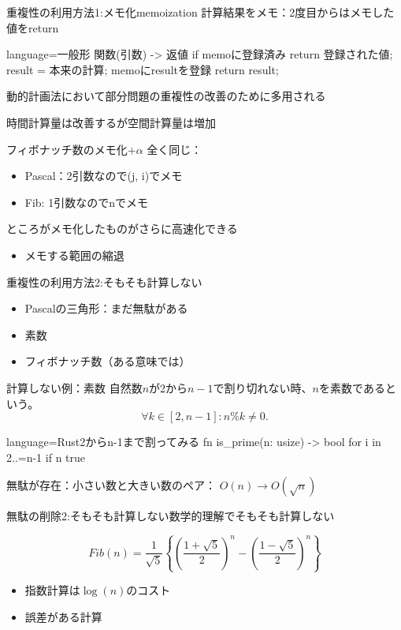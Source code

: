 \documentclass{beamer}
\begin{document}
\begin{frame}[fragile]{重複性の利用方法1:メモ化}{memoization}
計算結果をメモ：2度目からはメモした値をreturn
\vfill
\begin{codeof}{language=}{一般形}
関数(引数) -> 返値 {
  if memoに登録済み { return 登録された値; }
  result = 本来の計算;
  memoにresultを登録
  return result;
}
\end{codeof}
\vfill
動的計画法において部分問題の重複性の改善のために多用される

時間計算量は改善するが空間計算量は増加
\end{frame}

\begin{frame}[fragile]{フィボナッチ数のメモ化$+\alpha$}{}
全く同じ：
\begin{itemize}%
\item Pascal：2引数なので(j, i)でメモ
\item Fib: 1引数なのでnでメモ
\end{itemize}
\vfill
ところがメモ化したものがさらに高速化できる
\begin{itemize}%
\item メモする範囲の縮退
\end{itemize}
\end{frame}

\begin{frame}[fragile]{重複性の利用方法2:そもそも計算しない}{}
\begin{itemize}\itemsep8pt
\item Pascalの三角形：まだ無駄がある
\item 素数
\item フィボナッチ数（ある意味では）
\end{itemize}
\end{frame}

\begin{frame}[fragile]{計算しない例：素数}{}
自然数$n$が2から$n-1$で割り切れない時、$n$を素数であるという。
\[
\forall k \in [2, n-1] : n \% k \ne 0.
\]

\begin{codeof}{language=Rust}{2からn-1まで割ってみる}
fn is_prime(n: usize) -> bool {
    for i in 2..=n-1 {
        if n %
    }
    true
}
\end{codeof}

無駄が存在：小さい数と大きい数のペア：
$
O(n) \to O(\sqrt{n})
$
\end{frame}

\begin{frame}[fragile]{無駄の削除2:そもそも計算しない}{数学的理解でそもそも計算しない}

\[
Fib(n) = \frac{1}{\sqrt{5}}
\left\{
\left(\frac{1 + \sqrt{5}}{2}\right)^n
-
\left(\frac{1 - \sqrt{5}}{2}\right)^n
\right\}
\]

\vfill
\begin{itemize}%
\item 指数計算は$\log(n)$のコスト
\item 誤差がある計算
\end{itemize}

\end{frame}
\end{document}

